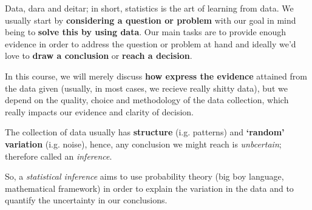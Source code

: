 Data, dara and deitar; in short, statistics is the art of learning from data. We usually start by \textbf{considering a question or problem} with our goal in mind being to \textbf{solve this by using
 data}. Our main tasks are to provide enough evidence in order to address the question or problem at hand and ideally we'd love to \textbf{draw a conclusion} or \textbf{reach a decision}.

 \vspace{0.2cm}

 In this course, we will merely discuss \textbf{how express the evidence} attained from the data given (usually, in most cases, we recieve really shitty data), but we depend on the quality, choice and methodology of
 the data collection, which really impacts our evidence and clarity of decision.

 \begin{remark}
    The collection of data usually has \textbf{structure} (i.g. patterns) and \textbf{`random' variation} (i.g. noise), hence, any conclusion we might reach is \textit{unbcertain}; therefore called an \textit{inference}.
 \end{remark}

 \vspace{0.2cm}

 So, a \textit{statistical inference} aims to use probability theory (big boy language, mathematical framework) in order to explain the variation in the data and to quantify the uncertainty in our conclusions.